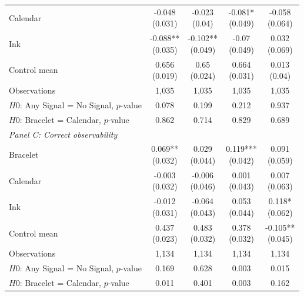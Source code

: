 {\begin{tabular}[t]{lcccc}
Calendar & \makecell[c]{-0.048\\{(0.031)}} & \makecell[c]{-0.023\\{(0.04)}} & \makecell[c]{-0.081*\\{(0.049)}} & \makecell[c]{-0.058\\{(0.064)}}\\
Ink & \makecell[c]{-0.088**\\{(0.035)}} & \makecell[c]{-0.102**\\{(0.049)}} & \makecell[c]{-0.07\\{(0.049)}} & \makecell[c]{0.032\\{(0.069)}}\\
\midrule
Control mean & \makecell[c]{0.656\\{(0.019)}} & \makecell[c]{0.65\\{(0.024)}} & \makecell[c]{0.664\\{(0.031)}} & \makecell[c]{0.013\\{(0.04)}}\\
Observations & 1,035 & 1,035 & 1,035 & 1,035\\
$H0$: Any Signal = No Signal, $p$-value & 0.078 & 0.199 & 0.212 & 0.937\\
$H0$: Bracelet = Calendar, $p$-value & 0.862 & 0.714 & 0.829 & 0.689\\
\midrule
\multicolumn{5}{l}{\textit{Panel C: Correct observability}} \\
Bracelet & \makecell[c]{0.069**\\{(0.032)}} & \makecell[c]{0.029\\{(0.044)}} & \makecell[c]{0.119***\\{(0.042)}} & \makecell[c]{0.091\\{(0.059)}}\\
Calendar & \makecell[c]{-0.003\\{(0.032)}} & \makecell[c]{-0.006\\{(0.046)}} & \makecell[c]{0.001\\{(0.043)}} & \makecell[c]{0.007\\{(0.063)}}\\
Ink & \makecell[c]{-0.012\\{(0.031)}} & \makecell[c]{-0.064\\{(0.043)}} & \makecell[c]{0.053\\{(0.044)}} & \makecell[c]{0.118*\\{(0.062)}}\\
\midrule
Control mean & \makecell[c]{0.437\\{(0.023)}} & \makecell[c]{0.483\\{(0.032)}} & \makecell[c]{0.378\\{(0.032)}} & \makecell[c]{-0.105**\\{(0.045)}}\\
Observations & 1,134 & 1,134 & 1,134 & 1,134\\
$H0$: Any Signal = No Signal, $p$-value & 0.169 & 0.628 & 0.003 & 0.015\\
$H0$: Bracelet = Calendar, $p$-value & 0.011 & 0.401 & 0.003 & 0.162\\
\bottomrule
\end{tabular}}
